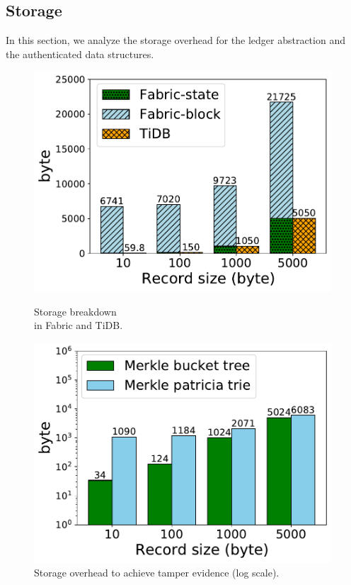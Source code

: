 \subsection{Storage}
\label{sec:twin:exp:storage}
In this section, we analyze the storage overhead for the ledger abstraction and
the authenticated data structures.

\begin{figure}[tp]
	\begin{minipage}{0.45\textwidth}
		\centering
		\includegraphics[width=0.99\textwidth]{chart/twin/record-size-storage.pdf}
		\caption{Storage breakdown \\ in Fabric and TiDB.}
		\label{chart:twin:record-size-storage}
	\end{minipage}\hfill
	\begin{minipage}{0.45\textwidth}
		\centering
		\includegraphics[width=0.99\textwidth]{chart/twin/record-size-antitamper.pdf}
		\caption{Storage overhead to achieve tamper evidence (log scale).}
		\label{chart:twin:record-size-antitamper}
	\end{minipage}\hfill
 \end{figure}

